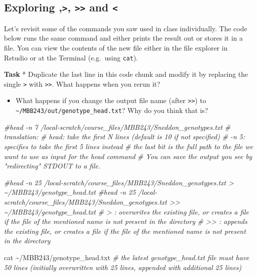 \documentclass[
]{article}
\newenvironment{Shaded}{\begin{snugshade}}{\end{snugshade}}
\newcommand{\CommentTok}[1]{\textcolor[rgb]{0.56,0.35,0.01}{\textit{#1}}}
\newcommand{\FunctionTok}[1]{\textcolor[rgb]{0.00,0.00,0.00}{#1}}
\newcommand{\NormalTok}[1]{#1}
\providecommand{\tightlist}{%
  \setlength{\itemsep}{0pt}\setlength{\parskip}{0pt}}
\begin{document}
\hypertarget{exploring-and}{%
\subsection{\texorpdfstring{Exploring
\texttt{\textbar{}},\texttt{\textgreater{}},
\texttt{\textgreater{}\textgreater{}} and
\texttt{\textless{}}}{Exploring \textbar,\textgreater, \textgreater\textgreater{} and \textless{}}}\label{exploring-and}}

Let's revisit some of the commands you saw used in class individually.
The code below runs the same command and either prints the result out or
stores it in a file. You can view the contents of the new file either in
the file explorer in Rstudio or at the Terminal (e.g.~using
\texttt{cat}).

\textbf{Task} * Duplicate the last line in this code chunk and modify it
by replacing the single \texttt{\textgreater{}} with
\texttt{\textgreater{}\textgreater{}}. What happens when you rerun it?

\begin{itemize}
\tightlist
\item
  What happens if you change the output file name (after
  \texttt{\textgreater{}\textgreater{}}) to
  \texttt{\textasciitilde{}/MBB243/out/genotype\_head.txt}? Why do you
  think that is?
\end{itemize}

\begin{Shaded}
\begin{Highlighting}[]
\CommentTok{\#head {-}n 7 /local{-}scratch/course\_files/MBB243/Sneddon\_genotypes.txt}
\CommentTok{\# translation:}
\CommentTok{\# head: take the first N lines (default is 10 if not specified)}
\CommentTok{\# {-}n 5: specifies to take the first 5 lines instead}
\CommentTok{\# the last bit is the full path to the file we want to use as input for the head command}
\CommentTok{\# You can save the output you see by "redirecting" STDOUT to a file. }

\CommentTok{\#head {-}n 25 /local{-}scratch/course\_files/MBB243/Sneddon\_genotypes.txt \textgreater{} \textasciitilde{}/MBB243/genotype\_head.txt}
\CommentTok{\#head {-}n 25 /local{-}scratch/course\_files/MBB243/Sneddon\_genotypes.txt \textgreater{}\textgreater{} \textasciitilde{}/MBB243/genotype\_head.txt}
\CommentTok{\# \textgreater{} : overwrites the existing file, or creates a file if the file of the mentioned name is not present in the directory}
\CommentTok{\# \textgreater{}\textgreater{} : appends the existing file, or creates a file if the file of the mentioned name is not present in the directory}

\FunctionTok{cat}\NormalTok{ \textasciitilde{}/MBB243/genotype\_head.txt}
\CommentTok{\# the latest genotype\_head.txt file must have 50 lines (initially overwritten with 25 lines, appended with additional 25 lines)}
\end{Highlighting}
\end{Shaded}
\end{document}
